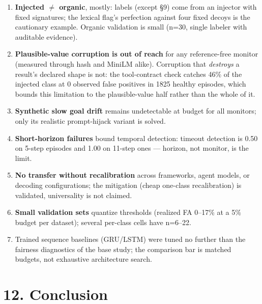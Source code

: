 \documentclass[11pt]{article}
\begin{document}
\begin{enumerate}
\item \textbf{Injected $\neq$ organic}, mostly: labels (except \S{}9) come from an injector with fixed signatures; the lexical flag's perfection against four fixed decoys is the cautionary example. Organic validation is small (n=30, single labeler with auditable evidence).
\item \textbf{Plausible-value corruption is out of reach} for any reference-free monitor (measured through hash and MiniLM alike). Corruption that \emph{destroys} a result's declared shape is not: the tool-contract check catches 46\% of the injected class at 0 observed false positives in 1825 healthy episodes, which bounds this limitation to the plausible-value half rather than the whole of it.
\item \textbf{Synthetic slow goal drift} remains undetectable at budget for all monitors; only its realistic prompt-hijack variant is solved.
\item \textbf{Short-horizon failures} bound temporal detection: timeout detection is 0.50 on 5-step episodes and 1.00 on 11-step ones --- horizon, not monitor, is the limit.
\item \textbf{No transfer without recalibration} across frameworks, agent models, or decoding configurations; the mitigation (cheap one-class recalibration) is validated, universality is not claimed.
\item \textbf{Small validation sets} quantize thresholds (realized FA 0--17\% at a 5\% budget per dataset); several per-class cells have n=6--22.
\item Trained sequence baselines (GRU/LSTM) were tuned no further than the fairness diagnostics of the base study; the comparison bar is matched budgets, not exhaustive architecture search.
\end{enumerate}

\section{12. Conclusion}
\end{document}
